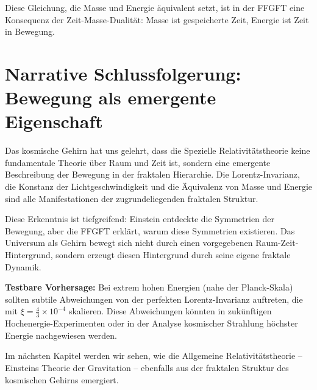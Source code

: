 \documentclass[12pt,a4paper]{article}
\begin{document}
Diese Gleichung, die Masse und Energie äquivalent setzt, ist in der FFGFT eine Konsequenz der Zeit-Masse-Dualität: Masse ist gespeicherte Zeit, Energie ist Zeit in Bewegung.

\section*{Narrative Schlussfolgerung: Bewegung als emergente Eigenschaft}

Das kosmische Gehirn hat uns gelehrt, dass die Spezielle Relativitätstheorie keine fundamentale Theorie über Raum und Zeit ist, sondern eine emergente Beschreibung der Bewegung in der fraktalen Hierarchie. Die Lorentz-Invarianz, die Konstanz der Lichtgeschwindigkeit und die Äquivalenz von Masse und Energie sind alle Manifestationen der zugrundeliegenden fraktalen Struktur.

Diese Erkenntnis ist tiefgreifend: Einstein entdeckte die Symmetrien der Bewegung, aber die FFGFT erklärt, warum diese Symmetrien existieren. Das Universum als Gehirn bewegt sich nicht durch einen vorgegebenen Raum-Zeit-Hintergrund, sondern erzeugt diesen Hintergrund durch seine eigene fraktale Dynamik.

\textbf{Testbare Vorhersage:} Bei extrem hohen Energien (nahe der Planck-Skala) sollten subtile Abweichungen von der perfekten Lorentz-Invarianz auftreten, die mit $\xi = \frac{4}{3} \times 10^{-4}$ skalieren. Diese Abweichungen könnten in zukünftigen Hochenergie-Experimenten oder in der Analyse kosmischer Strahlung höchster Energie nachgewiesen werden.

Im nächsten Kapitel werden wir sehen, wie die Allgemeine Relativitätstheorie -- Einsteins Theorie der Gravitation -- ebenfalls aus der fraktalen Struktur des kosmischen Gehirns emergiert.
\end{document}
